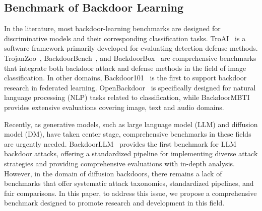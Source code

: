 \subsection{Benchmark of Backdoor Learning}
In the literature, most backdoor-learning benchmarks are designed for discriminative models and their corresponding classification tasks.
TroAI~\cite{karra2020trojai} is a software framework primarily developed for evaluating detection defense methods.
TrojanZoo~\cite{pang2022trojanzoo}, BackdoorBench~\cite{wu2022backdoorbench}, and BackdoorBox~\cite{li2023backdoorbox} are comprehensive benchmarks that integrate both backdoor attack and defense methods in the field of image classification.
In other domains, Backdoor101~\cite{bagdasaryan2021blind} is the first to support backdoor research in federated learning.
OpenBackdoor~\cite{cui2022unified} is specifically designed for natural language processing (NLP) tasks related to classification, while BackdoorMBTI~\cite{yu2024backdoormbti} provides extensive evaluations covering image, text and audio domains. 

Recently, as generative models, such as large language model (LLM) and diffusion model (DM), have taken center stage, comprehensive benchmarks in these fields are urgently needed. 
BackdoorLLM~\cite{li2024backdoorllm} provides the first benchmark for LLM backdoor attacks, offering a standardized pipeline for implementing diverse attack strategies and providing comprehensive evaluations with in-depth analysis.
However, in the domain of diffusion backdoors, there remains a lack of benchmarks that offer systematic attack taxonomies, standardized pipelines, and fair comparisons. 
In this paper, to address this issue, we propose a comprehensive benchmark designed to promote research and development in this field.
